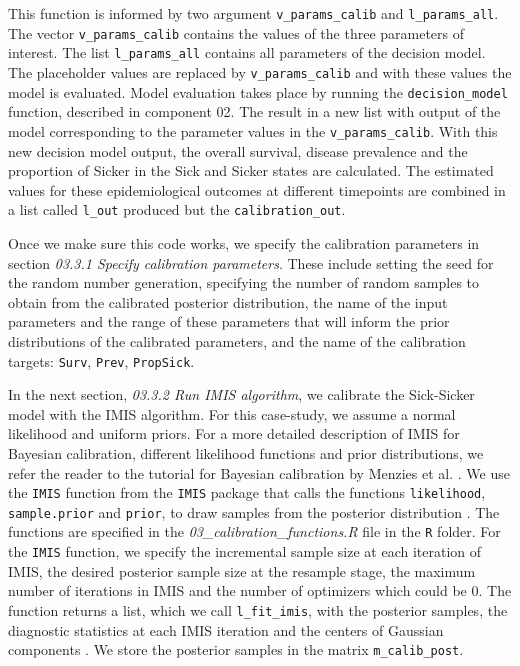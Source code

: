 \documentclass[]{book}
\begin{document}
This function is informed by two argument \texttt{v\_params\_calib} and
\texttt{l\_params\_all}. The vector \texttt{v\_params\_calib} contains
the values of the three parameters of interest. The list
\texttt{l\_params\_all} contains all parameters of the decision model.
The placeholder values are replaced by \texttt{v\_params\_calib} and
with these values the model is evaluated. Model evaluation takes place
by running the \texttt{decision\_model} function, described in component
02. The result in a new list with output of the model corresponding to
the parameter values in the \texttt{v\_params\_calib}. With this new
decision model output, the overall survival, disease prevalence and the
proportion of Sicker in the Sick and Sicker states are calculated. The
estimated values for these epidemiological outcomes at different
timepoints are combined in a list called \texttt{l\_out} produced but
the \texttt{calibration\_out}.

Once we make sure this code works, we specify the calibration parameters
in section \emph{03.3.1 Specify calibration parameters}. These include
setting the seed for the random number generation, specifying the number
of random samples to obtain from the calibrated posterior distribution,
the name of the input parameters and the range of these parameters that
will inform the prior distributions of the calibrated parameters, and
the name of the calibration targets: \texttt{Surv}, \texttt{Prev},
\texttt{PropSick}.

In the next section, \emph{03.3.2 Run IMIS algorithm}, we calibrate the
Sick-Sicker model with the IMIS algorithm. For this case-study, we
assume a normal likelihood and uniform priors. For a more detailed
description of IMIS for Bayesian calibration, different likelihood
functions and prior distributions, we refer the reader to the tutorial
for Bayesian calibration by Menzies et al. \citep{Menzies2017}. We use
the \texttt{IMIS} function from the \texttt{IMIS} package that calls the
functions \texttt{likelihood}, \texttt{sample.prior} and \texttt{prior},
to draw samples from the posterior distribution \citep{IMIS}. The
functions are specified in the \emph{03\_calibration\_functions.R} file
in the \texttt{R} folder. For the \texttt{IMIS} function, we specify the
incremental sample size at each iteration of IMIS, the desired posterior
sample size at the resample stage, the maximum number of iterations in
IMIS and the number of optimizers which could be 0. The function returns
a list, which we call \texttt{l\_fit\_imis}, with the posterior samples,
the diagnostic statistics at each IMIS iteration and the centers of
Gaussian components \citep{IMIS}. We store the posterior samples in the
matrix \texttt{m\_calib\_post}.
\end{document}
